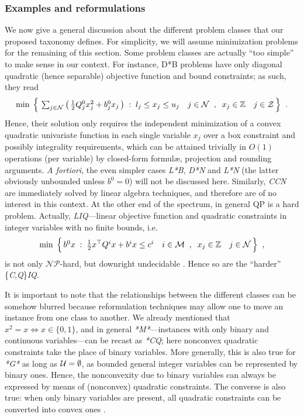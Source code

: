 \subsubsection{Examples and reformulations}\label{ssec:reform}

We now give a general discussion about the different problem classes that our proposed taxonomy defines.
For simplicity, we will assume minimization problems for the remaining of this section.
Some problem classes are actually ``too simple'' to make sense in our context. For instance, D*B problems have only diagonal quadratic (hence separable) objective function and bound constraints; as such, they read
\[
 \textstyle
 \min \; \Big\{ \,
 \sum_{j \in \mathcal{N}} \big( \, \frac{1}{2} Q^0_j x_j^2 + b^0_j x_j \, \big) \;:\;
 l_j \leq x_j \leq u_j \quad j \in \mathcal{N} \;\;,\;\;
 x_j \in \mathbb{Z} \quad j \in \mathcal{Z} \, \Big\}
 \;\; .
\]
Hence, their solution only requires the independent minimization of a convex quadratic univariate function in each single variable $x_j$ over a box constraint and possibly integrality requirements, which can be attained trivially in $O(1)$ operations (per variable) by closed-form formul{\ae}, projection and rounding arguments. \emph{A fortiori}, the even simpler cases \textit{L*B}, \textit{D*N} and \textit{L*N} (the latter obviously unbounded unless $b^0 = 0$) will not be discussed here. Similarly, \textit{CCN} are immediately solved by linear algebra techniques, and therefore are of no interest in this context. At the other end of the spectrum, in general QP is a hard problem. Actually, \textit{LIQ}---linear objective function and quadratic constraints in integer variables with no finite bounds, i.e.
\[
 \textstyle
 \min \; \Big\{ \, b^0 x \;:\;
 \frac{1}{2} x^\top Q^i x + b^i x \leq c^i \quad i \in \mathcal{M} \;\;,\;\;
 x_j \in \mathbb{Z} \quad j \in \mathcal{N} \, \Big\}
 \;\; ,
\]
is not only $\mathcal{NP}$-hard, but downright undecidable \cite{jeroslow}. Hence so are the ``harder'' \{\textit{C},\textit{Q}\}\textit{IQ}.

\smallskip
It is important to note that the relationships between the different classes can be somehow blurred because reformulation techniques may allow one to move an instance from one class to another. We already mentioned that $x^2 = x \iff x \in \{0, 1\}$, and in general \textit{*M*}---instances with only binary and continuous variables---can be recast as \textit{*CQ}; here nonconvex quadratic constraints take the place of binary variables. More generally, this is also true for \textit{*G*} as long as $\mathcal{U} = \emptyset$, as bounded general integer variables can be represented by binary ones.
Hence, the nonconvexity due to binary variables can always be expressed by means of (nonconvex) quadratic constraints. The converse is also true: when only binary variables are present, all quadratic constraints can be converted into convex ones \cite{BEP09,BEL13}.


